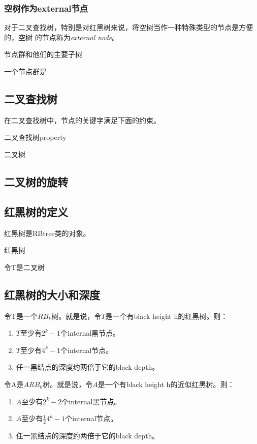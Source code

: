 \subsubsection{空树作为external节点}
对于二叉查找树，特别是对红黑树来说，将空树当作一种特殊类型的节点是方便的，空树
的节点称为\emph{external node}。
\begin{definition}
节点群和他们的主要子树

一个节点群是
\end{definition}

\subsection{二叉查找树}
在二叉查找树中，节点的关键字满足下面的约束。
\begin{definition}
二叉查找树property

二叉树
\end{definition}

\subsection{二叉树的旋转}
\subsection{红黑树的定义}
红黑树是RBtree类的对象。
\begin{definition}
红黑树

令T是二叉树
\end{definition}

\subsection{红黑树的大小和深度}
\begin{lemma}
令T是一个$RB_k$树。就是说，令$T$是一个有black height h的红黑树。则：
\begin{enumerate}
\item $T$至少有$2^k-1$个internal黑节点。
\item $T$至少有$4^k-1$个internal节点。
\item 任一黑结点的深度约两倍于它的black depth。
\end{enumerate}

令A是$ARB_k$树。就是说，令$A$是一个有black height h的近似红黑树。则：
\begin{enumerate}
\item $A$至少有$2^k-2$个internal黑节点。
\item $A$至少有$\frac{1}{2}4^k-1$个internal节点。
\item 任一黑结点的深度约两倍于它的black depth。
\end{enumerate}

\end{lemma}

